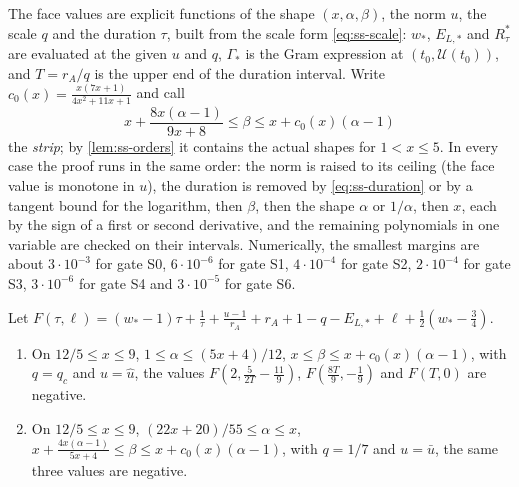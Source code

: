 The face values are explicit functions of the shape $(x,\alpha,\beta)$, the norm $u$, the scale
$q$ and the duration $\tau$, built from the scale form \eqref{eq:ss-scale}: $w_*$, $E_{L,*}$ and
$R^*_\tau$ are evaluated at the given $u$ and $q$, $\Gamma_*$ is the Gram expression at
$(t_0,\mathcal U(t_0))$, and $T=r_A/q$ is the upper end of the duration interval. Write
$c_0(x)=\frac{x(7x+1)}{4x^2+11x+1}$ and call
\[
  x+\frac{8x(\alpha-1)}{9x+8}\le\beta\le x+c_0(x)(\alpha-1)
\]
the \emph{strip}; by \cref{lem:ss-orders} it contains the actual shapes for $1<x\le5$. In every
case the proof runs in the same order: the norm is raised to its ceiling (the face value is
monotone in $u$), the duration is removed by \eqref{eq:ss-duration} or by a tangent bound for the
logarithm, then $\beta$, then the shape $\alpha$ or $1/\alpha$, then $x$, each by the sign of a
first or second derivative, and the remaining polynomials in one variable are checked on their
intervals. Numerically, the smallest margins are about $3\cdot10^{-3}$ for gate S0,
$6\cdot10^{-6}$ for gate S1, $4\cdot10^{-4}$ for gate S2, $2\cdot10^{-4}$ for gate S3,
$3\cdot10^{-6}$ for gate S4 and $3\cdot10^{-5}$ for gate S6.

\begin{proposition}\label{prop:ss-face-S0}
Let $F(\tau,\ell)=(w_*-1)\tau+\frac1\tau+\frac{u-1}{r_A}+r_A+1-q-E_{L,*}+\ell+\frac12(w_*-\frac34)$.
\begin{enumerate}[label=(\alph*)]
\item On $12/5\le x\le9$, $1\le\alpha\le(5x+4)/12$, $x\le\beta\le x+c_0(x)(\alpha-1)$, with $q=q_c$
  and $u=\hat u$, the values $F(2,\frac5{2T}-\frac{11}9)$, $F(\frac{8T}9,-\frac19)$ and $F(T,0)$
  are negative.
\item On $12/5\le x\le9$, $(22x+20)/55\le\alpha\le x$,
  $x+\frac{4x(\alpha-1)}{5x+4}\le\beta\le x+c_0(x)(\alpha-1)$, with $q=1/7$ and $u=\bar u$, the
  same three values are negative.
\end{enumerate}
\end{proposition}

